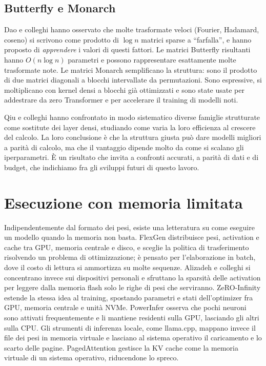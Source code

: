 \subsection{Butterfly e Monarch}

Dao e colleghi \cite{dao2019learning} hanno osservato che molte trasformate veloci (Fourier, Hadamard, coseno) si scrivono come prodotto di $\log n$ matrici sparse a ``farfalla'', e hanno proposto di \emph{apprendere} i valori di questi fattori. Le matrici Butterfly risultanti hanno $O(n\log n)$ parametri e possono rappresentare esattamente molte trasformate note. Le matrici Monarch \cite{dao2022monarch} semplificano la struttura: sono il prodotto di due matrici diagonali a blocchi intervallate da permutazioni. Sono espressive, si moltiplicano con kernel densi a blocchi già ottimizzati e sono state usate per addestrare da zero Transformer e per accelerare il training di modelli noti.

Qiu e colleghi \cite{qiu2024compute} hanno confrontato in modo sistematico diverse famiglie strutturate come sostitute dei layer densi, studiando come varia la loro efficienza al crescere del calcolo. La loro conclusione è che la struttura giusta può dare modelli migliori a parità di calcolo, ma che il vantaggio dipende molto da come si scalano gli iperparametri. È un risultato che invita a confronti accurati, a parità di dati e di budget, che indichiamo fra gli sviluppi futuri di questo lavoro.

\section{Esecuzione con memoria limitata}

Indipendentemente dal formato dei pesi, esiste una letteratura su come eseguire un modello quando la memoria non basta. FlexGen \cite{sheng2023flexgen} distribuisce pesi, activation e cache tra GPU, memoria centrale e disco, e sceglie la politica di trasferimento risolvendo un problema di ottimizzazione; è pensato per l'elaborazione in batch, dove il costo di lettura si ammortizza su molte sequenze. Alizadeh e colleghi \cite{alizadeh2024llm} si concentrano invece sui dispositivi personali e sfruttano la sparsità delle activation per leggere dalla memoria flash solo le righe di pesi che serviranno. ZeRO-Infinity \cite{rajbhandari2021zero} estende la stessa idea al training, spostando parametri e stati dell'optimizer fra GPU, memoria centrale e unità NVMe. PowerInfer \cite{song2023powerinfer} osserva che pochi neuroni sono attivati frequentemente e li mantiene residenti sulla GPU, lasciando gli altri sulla CPU. Gli strumenti di inferenza locale, come llama.cpp, mappano invece il file dei pesi in memoria virtuale e lasciano al sistema operativo il caricamento e lo scarto delle pagine. PagedAttention \cite{kwon2023efficient} gestisce la KV cache come la memoria virtuale di un sistema operativo, riducendone lo spreco.

